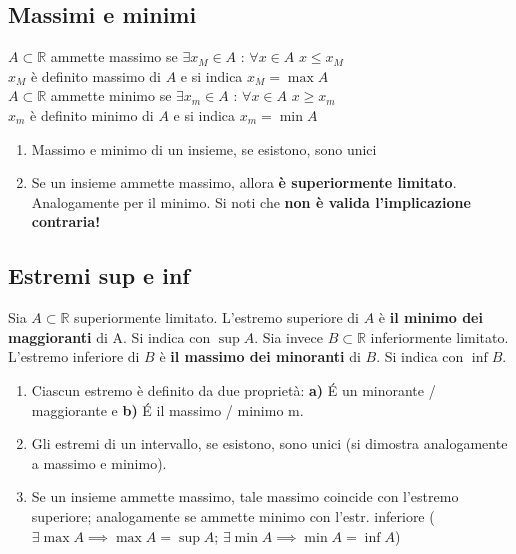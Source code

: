 \documentclass[10pt, oneside]{book}
\theoremstyle{plain}
\begin{document}
\subsection{Massimi e minimi}
\begin{defin}
    $A \subset \mathbb{R}$ ammette massimo se $\exists x_M \in A$ : $\forall x \in A$ $x \leq x_M$
    \\$x_M$ è definito massimo di $A$ e si indica $x_M = \max A$
    \\$A \subset \mathbb{R}$ ammette minimo se $\exists x_m \in A$ : $\forall x \in A$ $x \geq x_m$
    \\$x_m$ è definito minimo di $A$ e si indica $x_m = \min A$
\end{defin}
\begin{oss}
    \begin{enumerate}
        \item Massimo e minimo di un insieme, se esistono, sono unici
        \item Se un insieme ammette massimo, allora \textbf{è superiormente limitato}. Analogamente per il minimo. Si noti che \textbf{non è valida l'implicazione contraria!}
    \end{enumerate}
\end{oss}

\subsection{Estremi sup e inf}
\begin{defin}
    Sia $A \subset \mathbb{R}$ superiormente limitato. L'estremo superiore di $A$ è \textbf{il minimo dei maggioranti} di A. Si indica con $\sup A$.
     Sia invece $B \subset \mathbb{R}$ inferiormente limitato. L'estremo inferiore di $B$ è \textbf{il massimo dei minoranti} di $B$. Si indica con $\inf B$.
\end{defin}
\begin{oss}
    \begin{enumerate}
        \item Ciascun estremo è definito da due proprietà: \textbf{a)} \'E un minorante / maggiorante e \textbf{b)} \'E il massimo / minimo m.
    \item Gli estremi di un intervallo, se esistono, sono unici (si dimostra analogamente a massimo e minimo).
    \item Se un insieme ammette massimo, tale massimo coincide con l'estremo superiore; analogamente se ammette minimo con l'estr. inferiore ($\exists \max A \implies \max A = \sup A$; $\exists \min A \implies \min A = \inf A$)
    \end{enumerate}
\end{oss}
\end{document}

